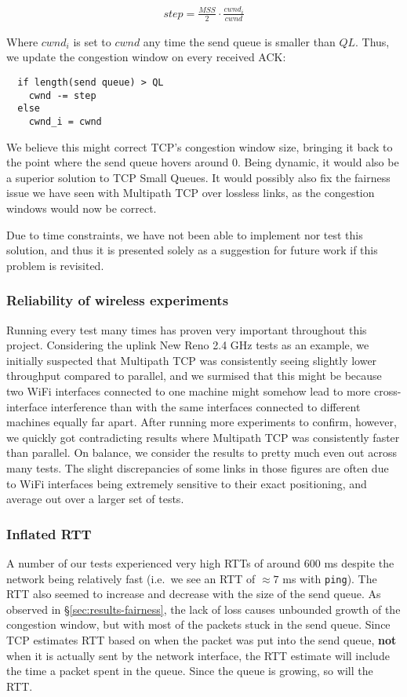 \begin{align*}
  step = \frac{MSS}{2} \cdot \frac{cwnd_i}{cwnd}
\end{align*}

Where $cwnd_i$ is set to $cwnd$ any time the send queue is smaller than $QL$.
Thus, we update the congestion window on every received ACK:

\begin{verbatim}
  if length(send queue) > QL
    cwnd -= step
  else
    cwnd_i = cwnd
\end{verbatim}

We believe this might correct TCP's congestion window size, bringing it back to
the point where the send queue hovers around 0. Being dynamic, it would also be
a superior solution to TCP Small Queues. It would possibly also fix the fairness
issue we have seen with Multipath TCP over lossless links, as the congestion
windows would now be correct.

Due to time constraints, we have not been able to implement nor test this
solution, and thus it is presented solely as a suggestion for future work
if this problem is revisited.

\subsubsection{Reliability of wireless experiments}
Running every test many times has proven very important throughout this project.
Considering the uplink New Reno 2.4 GHz tests as an example, we initially 
suspected that Multipath TCP was consistently seeing slightly lower 
throughput compared to parallel, and we surmised that this might be because two 
WiFi interfaces connected to one machine might somehow lead to more 
cross-interface interference than with the same interfaces connected to 
different machines equally far apart. After running more experiments to confirm, 
however, we quickly got contradicting results where Multipath TCP was 
consistently faster than parallel. On balance, we consider the results to pretty 
much even out across many tests. The slight discrepancies of some links in those 
figures are often due to WiFi interfaces being extremely sensitive to their 
exact positioning, and average out over a larger set of tests.

\subsubsection{Inflated RTT}
A number of our tests experienced very high RTTs of around 600 ms despite the network
being relatively fast (i.e.\ we see an RTT of $\approx 7$ ms with \texttt{ping}).
The RTT also seemed to increase and decrease with the size of the send queue. As 
observed in \S\ref{sec:results-fairness}, the lack of loss causes 
unbounded growth of the congestion window, but with most of the packets stuck in 
the send queue. Since TCP estimates RTT based on when the packet was put into 
the send queue, \textbf{not} when it is actually sent by the network interface, 
the RTT estimate will include the time a packet spent in the queue. Since the 
queue is growing, so will the RTT.


